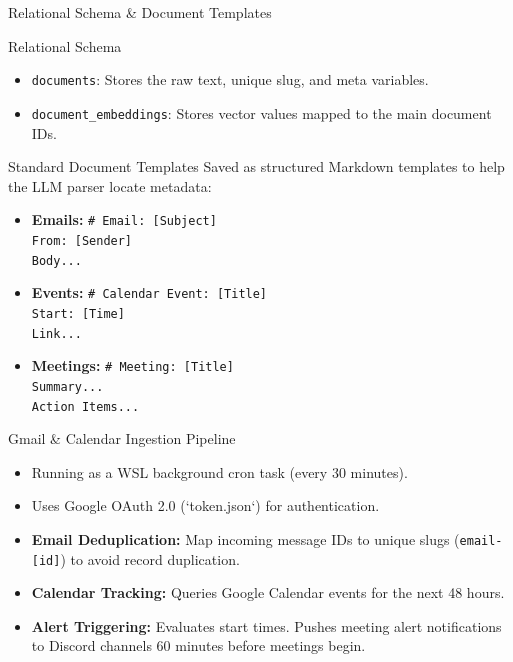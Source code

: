 \documentclass[10pt]{beamer}
\begin{document}
\begin{frame}{Relational Schema \& Document Templates}
  \begin{block}{Relational Schema}
    \begin{itemize}
      \item \texttt{documents}: Stores the raw text, unique slug, and meta variables.
      \item \texttt{document\_embeddings}: Stores vector values mapped to the main document IDs.
    \end{itemize}
  \end{block}
  \begin{block}{Standard Document Templates}
    Saved as structured Markdown templates to help the LLM parser locate metadata:
    \begin{itemize}
      \item \textbf{Emails:} \texttt{\# Email: [Subject] \\ From: [Sender] \\ Body...}
      \item \textbf{Events:} \texttt{\# Calendar Event: [Title] \\ Start: [Time] \\ Link...}
      \item \textbf{Meetings:} \texttt{\# Meeting: [Title] \\ Summary... \\ Action Items...}
    \end{itemize}
  \end{block}
\end{frame}

\begin{frame}{Gmail & Calendar Ingestion Pipeline}
  \begin{itemize}
    \item Running as a WSL background cron task (every 30 minutes).
    \item Uses Google OAuth 2.0 (`token.json`) for authentication.
    \item \textbf{Email Deduplication:} Map incoming message IDs to unique slugs (\texttt{email-[id]}) to avoid record duplication.
    \item \textbf{Calendar Tracking:} Queries Google Calendar events for the next 48 hours.
    \item \textbf{Alert Triggering:} Evaluates start times. Pushes meeting alert notifications to Discord channels 60 minutes before meetings begin.
  \end{itemize}
\end{frame}
\end{document}
